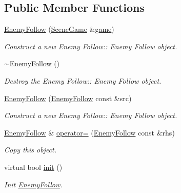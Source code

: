 \subsection*{Public Member Functions}
\begin{DoxyCompactItemize}
\item 
\hyperlink{class_enemy_follow_a5dac0d66f1ea5a344ea4d73432c42e9d}{Enemy\+Follow} (\hyperlink{class_scene_game}{Scene\+Game} \&\hyperlink{class_a_entity_aa2c05db944a8b7487eb8470dd20211ab}{game})
\begin{DoxyCompactList}\small\item\em Construct a new Enemy Follow\+:\+: Enemy Follow object. \end{DoxyCompactList}\item 
\mbox{\label{class_enemy_follow_acec4341e928f997cc639811bfeabbb95}} 
\hyperlink{class_enemy_follow_acec4341e928f997cc639811bfeabbb95}{$\sim$\+Enemy\+Follow} ()
\begin{DoxyCompactList}\small\item\em Destroy the Enemy Follow\+:\+: Enemy Follow object. \end{DoxyCompactList}\item 
\hyperlink{class_enemy_follow_a69648445aa5c2dbf8479729d05d530d1}{Enemy\+Follow} (\hyperlink{class_enemy_follow}{Enemy\+Follow} const \&src)
\begin{DoxyCompactList}\small\item\em Construct a new Enemy Follow\+:\+: Enemy Follow object. \end{DoxyCompactList}\item 
\hyperlink{class_enemy_follow}{Enemy\+Follow} \& \hyperlink{class_enemy_follow_a3cc6083a7064b33fabe7e0b7a4a69910}{operator=} (\hyperlink{class_enemy_follow}{Enemy\+Follow} const \&rhs)
\begin{DoxyCompactList}\small\item\em Copy this object. \end{DoxyCompactList}\item 
virtual bool \hyperlink{class_enemy_follow_a09963fbac6d395dbf653b6353412cf2b}{init} ()
\begin{DoxyCompactList}\small\item\em Init \hyperlink{class_enemy_follow}{Enemy\+Follow}. \end{DoxyCompactList}\end{DoxyCompactItemize}
